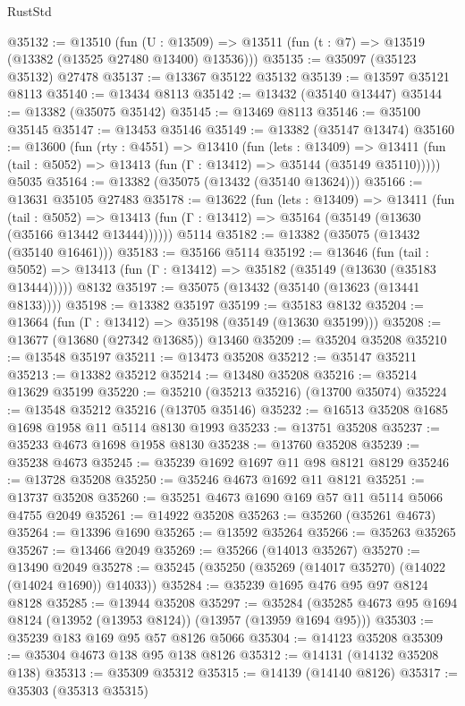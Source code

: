 \begin{lexlean}{RustStd}
\begin{coremodule}
@35132 := @13510
    (fun (U : @13509) => @13511 (fun (t : @7) => @13519 (@13382 (@13525 @27480 @13400) @13536)))
@35135 := @35097 (@35123 @35132) @27478
@35137 := @13367 @35122 @35132
@35139 := @13597 @35121 @8113
@35140 := @13434 @8113
@35142 := @13432 (@35140 @13447)
@35144 := @13382 (@35075 @35142)
@35145 := @13469 @8113
@35146 := @35100 @35145
@35147 := @13453 @35146
@35149 := @13382 (@35147 @13474)
@35160 := @13600
    (fun (rty : @4551) =>
    @13410
      (fun (lets : @13409) =>
      @13411 (fun (tail : @5052) => @13413 (fun (Γ : @13412) => @35144 (@35149 @35110)))))
    @5035
@35164 := @13382 (@35075 (@13432 (@35140 @13624)))
@35166 := @13631 @35105 @27483
@35178 := @13622
    (fun (lets : @13409) =>
    @13411
      (fun (tail : @5052) =>
      @13413 (fun (Γ : @13412) => @35164 (@35149 (@13630 (@35166 @13442 @13444))))))
    @5114
@35182 := @13382 (@35075 (@13432 (@35140 @16461)))
@35183 := @35166 @5114
@35192 := @13646
    (fun (tail : @5052) => @13413 (fun (Γ : @13412) => @35182 (@35149 (@13630 (@35183 @13444)))))
    @8132
@35197 := @35075 (@13432 (@35140 (@13623 (@13441 @8133))))
@35198 := @13382 @35197
@35199 := @35183 @8132
@35204 := @13664 (fun (Γ : @13412) => @35198 (@35149 (@13630 @35199)))
@35208 := @13677 (@13680 (@27342 @13685)) @13460
@35209 := @35204 @35208
@35210 := @13548 @35197
@35211 := @13473 @35208
@35212 := @35147 @35211
@35213 := @13382 @35212
@35214 := @13480 @35208
@35216 := @35214 @13629 @35199
@35220 := @35210 (@35213 @35216) (@13700 @35074)
@35224 := @13548 @35212 @35216 (@13705 @35146)
@35232 := @16513 @35208 @1685 @1698 @1958 @11 @5114 @8130 @1993
@35233 := @13751 @35208
@35237 := @35233 @4673 @1698 @1958 @8130
@35238 := @13760 @35208
@35239 := @35238 @4673
@35245 := @35239 @1692 @1697 @11 @98 @8121 @8129
@35246 := @13728 @35208
@35250 := @35246 @4673 @1692 @11 @8121
@35251 := @13737 @35208
@35260 := @35251 @4673 @1690 @169 @57 @11 @5114 @5066 @4755 @2049
@35261 := @14922 @35208
@35263 := @35260 (@35261 @4673)
@35264 := @13396 @1690
@35265 := @13592 @35264
@35266 := @35263 @35265
@35267 := @13466 @2049
@35269 := @35266 (@14013 @35267)
@35270 := @13490 @2049
@35278 := @35245 (@35250 (@35269 (@14017 @35270) (@14022 (@14024 @1690)) @14033))
@35284 := @35239 @1695 @476 @95 @97 @8124 @8128
@35285 := @13944 @35208
@35297 := @35284 (@35285 @4673 @95 @1694 @8124 (@13952 (@13953 @8124)) (@13957 (@13959 @1694 @95)))
@35303 := @35239 @183 @169 @95 @57 @8126 @5066
@35304 := @14123 @35208
@35309 := @35304 @4673 @138 @95 @138 @8126
@35312 := @14131 (@14132 @35208 @138)
@35313 := @35309 @35312
@35315 := @14139 (@14140 @8126)
@35317 := @35303 (@35313 @35315)

\end{coremodule}
\end{lexlean}
